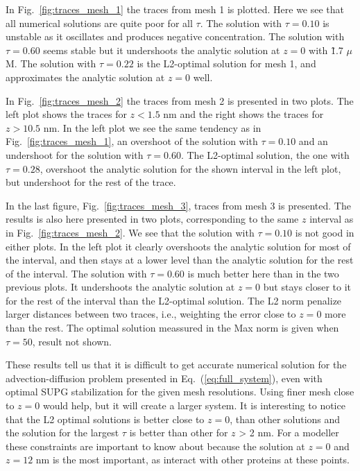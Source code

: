 In Fig.~\ref{fig:traces_mesh_1} the traces from mesh 1 is plotted. Here we see that all numerical solutions are quite poor for all $\tau$. The solution with $\tau=0.10$ is unstable as it oscillates and produces negative concentration. The solution with $\tau=0.60$ seems stable but it undershoots the analytic solution at $z=0$ with \~ 1.7 $\mu$M. The solution with $\tau=0.22$ is the L2-optimal solution for mesh 1, and approximates the analytic solution at $z=0$ well.\par

In Fig.~\ref{fig:traces_mesh_2} the traces from mesh 2 is presented in two plots. The left plot shows the traces for $z<1.5$ nm and the right shows the traces for $z>10.5$ nm. In the left plot we see the same tendency as in Fig.~\ref{fig:traces_mesh_1}, an overshoot of the solution with $\tau=0.10$ and an undershoot for the solution with $\tau=0.60$. The L2-optimal solution, the one with $\tau=0.28$, overshoot the analytic solution for the shown interval in the left plot, but undershoot for the rest of the trace. \par

In the last figure, Fig.~\ref{fig:traces_mesh_3}, traces from mesh 3 is presented. The results is also here presented in two plots, corresponding to the same $z$ interval as in Fig.~\ref{fig:traces_mesh_2}. We see that the solution with $\tau=0.10$ is not good in either plots. In the left plot it clearly overshoots the analytic solution for most of the interval, and then stays at a lower level than the analytic solution for the rest of the interval. The solution with $\tau=0.60$ is much better here than in the two previous plots. It undershoots the analytic solution at $z=0$ but stays closer to it for the rest of the interval than the L2-optimal solution. The L2 norm penalize larger distances between two traces, i.e., weighting the error close to $z=0$ more than the rest. The optimal solution meassured in the Max norm is given when $\tau=50$, result not shown.\par

These results tell us that it is difficult to get accurate numerical solution for the advection-diffusion problem presented in Eq.~(\ref{eq:full_system}), even with optimal SUPG stabilization for the given mesh resolutions. Using finer mesh close to $z=0$ would help, but it will create a larger system. It is interesting to notice that the L2 optimal solutions is better close to $z=0$, than other solutions and the solution for the largest $\tau$ is better than other for $z$ > 2 nm. For a modeller these constraints are important to know about because the solution at $z=0$ and $z=12$ nm is the most important, as \Ca interact with other proteins at these points.\par

